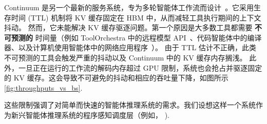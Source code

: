 Continuum 是另一个最新的服务系统，专为多轮智能体工作流而设计~\cite{li2025continuumefficientrobustmultiturn}。它采用生存时间 (TTL) 机制将 KV 缓存固定在 HBM 中，从而减轻工具执行期间的上下文抖动。
然而，它未能解决 KV 缓存驱逐问题。第一个原因是大多数工具都需要 \textbf{不可预测的} 时间量（例如 ToolOrchestra 中的远程模型 API~\citep{su2025toolorchestraelevatingintelligenceefficient}、代码智能体中的编译器、以及计算机使用智能体中的网络应用程序~\citep{zhou2024webarenarealisticwebenvironment}）。
由于 TTL 估计不正确，此类不可预测的工具会触发严重的抖动以及 Continuum 中的 KV 缓存内存搁浅。
此外，一旦正在运行的工作流的解码内存超过 GPU 限制，系统也会抢占并驱逐固定的 KV 缓存。这会导致不可避免的抖动和相应的吞吐量下降，如图所示 \autoref{fig:throughputs_vs_bs}.


这些限制强调了对简单而快速的智能体推理系统的需求。我们设想这样一个系统作为新兴智能体推理系统的程序感知调度层（例如， \citet{zhang2026megaflow}).

